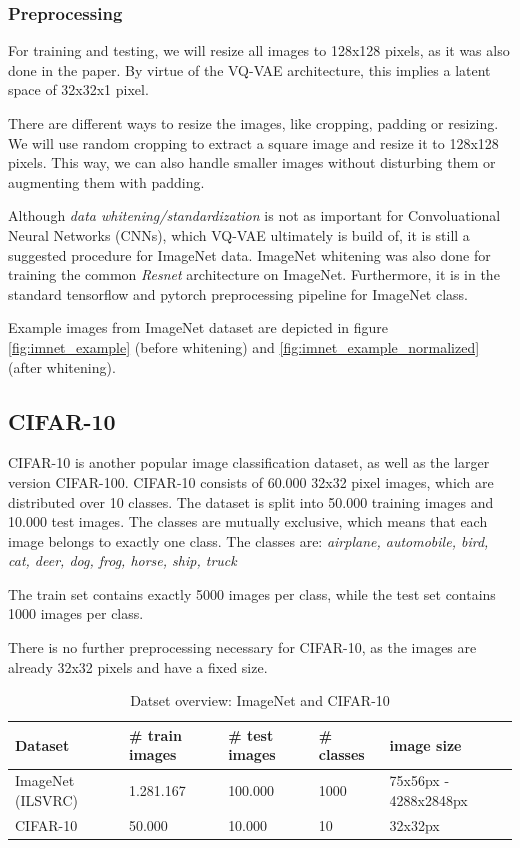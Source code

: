 \documentclass[10pt,a4paper,twoside]{article}
\begin{document}
    \subsubsection{Preprocessing}
    For training and testing, we will resize all images to 128x128 pixels, as it was also done in the paper. By virtue of the VQ-VAE architecture, this implies a latent space of 32x32x1 pixel.

    There are different ways to resize the images, like cropping, padding or resizing. We will use random cropping to extract a square image and resize it to 128x128 pixels. This way, we can also handle smaller images without disturbing them or augmenting them with padding.


    Although \textit{data whitening/standardization} is not as important for Convoluational Neural Networks (CNNs), which VQ-VAE ultimately is build of, it is still a suggested procedure for ImageNet data. ImageNet whitening was also done for training the common
    \textit{Resnet} architecture \cite{resnet} on ImageNet. Furthermore, it is in the standard tensorflow and pytorch preprocessing pipeline for ImageNet class.

    Example images from ImageNet dataset are depicted in figure \ref{fig:imnet_example} (before whitening) and \ref{fig:imnet_example_normalized} (after whitening).

    \subsection{CIFAR-10}
    CIFAR-10 \cite{cifar10} is another popular image classification dataset, as well as the larger version CIFAR-100. CIFAR-10 consists of 60.000 32x32 pixel images, which are distributed over 10 classes. The dataset is split into 50.000 training images and 10.000 test images. The classes are mutually exclusive, which means that each image belongs to exactly one class. The classes are: \textit{airplane, automobile, bird, cat, deer, dog, frog, horse, ship, truck}

    The train set contains exactly 5000 images per class, while the test set contains 1000 images per class.

    There is no further preprocessing necessary for CIFAR-10, as the images are already 32x32 pixels and have a fixed size.

    \begin{table}[]
        \begin{tabular}{lllll}
        Dataset & \# train images & \# test images & \# classes & image size \\ \hline \hline
          ImageNet (ILSVRC)  & 1.281.167    &        100.000        &      1000       &    75x56px - 4288x2848px       \\
        CIFAR-10   &        50.000     &      10.000      &    10    &     32x32px       \\ \hline \hline
        \end{tabular}
        \caption{Datset overview: ImageNet and CIFAR-10}
        \label{tab:datasets}
    \end{table}
\end{document}
